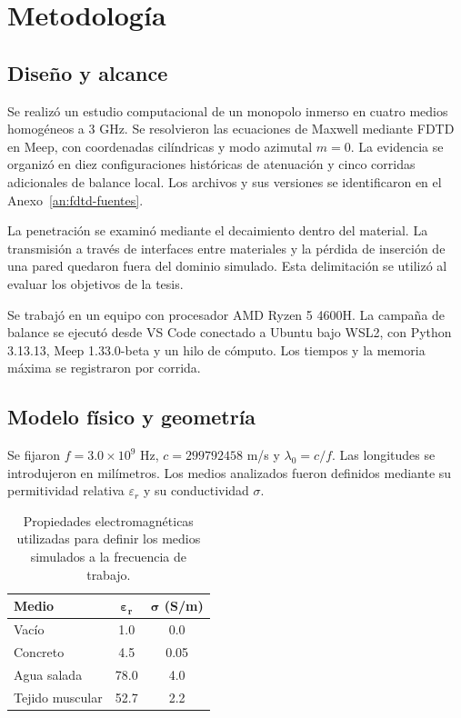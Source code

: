 \chapter{Metodología}
\section{Diseño y alcance}
Se realizó un estudio computacional de un monopolo inmerso en cuatro medios homogéneos a 3 GHz. Se resolvieron las ecuaciones de Maxwell mediante FDTD en Meep, con coordenadas cilíndricas y modo azimutal $m=0$. La evidencia se organizó en diez configuraciones históricas de atenuación y cinco corridas adicionales de balance local. Los archivos y sus versiones se identificaron en el Anexo~\ref{an:fdtd-fuentes}.

La penetración se examinó mediante el decaimiento dentro del material. La transmisión a través de interfaces entre materiales y la pérdida de inserción de una pared quedaron fuera del dominio simulado. Esta delimitación se utilizó al evaluar los objetivos de la tesis.

Se trabajó en un equipo con procesador AMD Ryzen 5 4600H. La campaña de balance se ejecutó desde VS Code conectado a Ubuntu bajo WSL2, con Python 3.13.13, Meep 1.33.0-beta y un hilo de cómputo. Los tiempos y la memoria máxima se registraron por corrida.

\section{Modelo físico y geometría}
Se fijaron $f=3.0\times10^9$ Hz, $c=299792458$ m/s y $\lambda_0=c/f$. Las longitudes se introdujeron en milímetros.
Los medios analizados fueron definidos mediante su permitividad relativa $\varepsilon_r$ y su conductividad $\sigma$.

\begin{table}[H]
\centering
\begin{tabular}{|l|c|c|}
\hline
\textbf{Medio} & $\boldsymbol{\varepsilon_r}$ & $\boldsymbol{\sigma}$ (\textbf{S/m}) \\ \hline
Vacío & 1.0 & 0.0 \\ \hline
Concreto & 4.5 & 0.05 \\ \hline
Agua salada & 78.0 & 4.0 \\ \hline
Tejido muscular & 52.7 & 2.2 \\ \hline
\end{tabular}
\caption{Propiedades electromagnéticas utilizadas para definir los medios simulados a la frecuencia de trabajo.}
\label{tab:materiales_metodologia}
\end{table}

